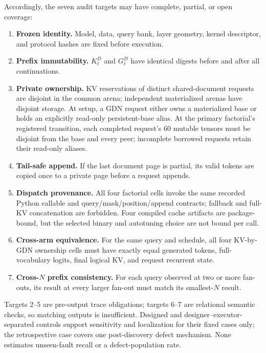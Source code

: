 \documentclass{article}
\begin{document}
Accordingly, the seven audit targets may have complete, partial, or open coverage:
\FloatBarrier
\begin{enumerate}
  \setlength{\itemsep}{1pt}
  \setlength{\parskip}{0pt}
  \item \textbf{Frozen identity.}  Model, data, query bank, layer geometry,
  kernel descriptor, and protocol hashes are fixed before execution.
  \item \textbf{Prefix immutability.}  $K^D_\ell$ and $G^D_\ell$ have identical
  digests before and after all continuations.
  \item \textbf{Private ownership.}  KV reservations of distinct
  shared-document requests are disjoint in the common arena; independent
  materialized arenas have disjoint storage.  At setup, a GDN request either
  owns a materialized base or holds an explicitly read-only persistent-base
  alias.  At the primary factorial's registered transition, each completed
  request's 60 mutable tensors must be disjoint from the base and every peer;
  incomplete borrowed requests retain their read-only aliases.
  \item \textbf{Tail-safe append.}  If the last document page is partial, its
  valid tokens are copied once to a private page before a request appends.
  \item \textbf{Dispatch provenance.}  All four factorial cells invoke the same recorded
  Python callable and query/mask/position/append contracts; fallback and
  full-KV concatenation are forbidden.  Four compiled cache artifacts are
  package-bound, but the selected binary and autotuning choice are not bound
  per call.
  \item \textbf{Cross-arm equivalence.}  For the same query and schedule, all
  four KV-by-GDN ownership cells must have exactly equal generated
  tokens, full-vocabulary logits, final logical KV, and request recurrent
  state.
  \item \textbf{Cross-$N$ prefix consistency.}  For each query observed at two or more
  fan-outs, its result at every larger fan-out must match its smallest-$N$
  result.
\end{enumerate}

Targets 2--5 are pre-output trace obligations; targets 6--7 are relational
semantic checks, so matching outputs is insufficient.  Designed and
designer--executor-separated controls support sensitivity and localization for
their fixed cases only; the retrospective case covers one post-discovery defect
mechanism.  None estimates unseen-fault recall or a defect-population rate.
\end{document}
